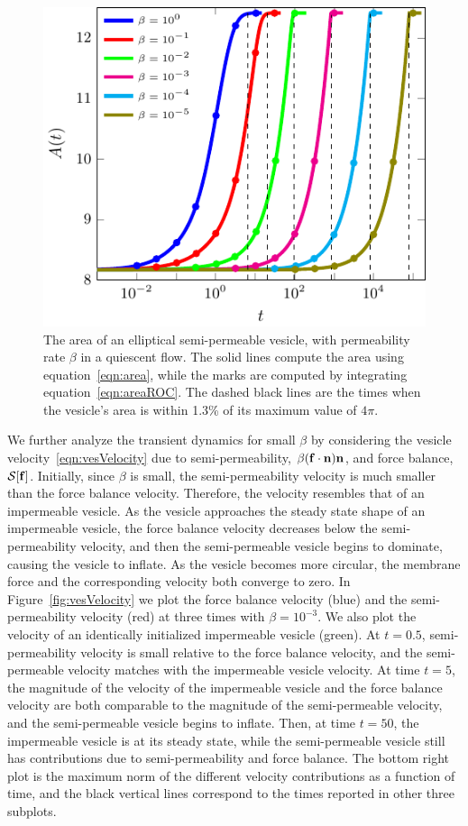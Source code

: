 \documentclass[9pt,twocolumn,twoside,lineno]{pnas-new}
\newif\ifTikz
\begin{document}
\begin{figure}[htp]
  \centering
%  
  \includegraphics[width=0.8\linewidth]{figures/ellipseArea}
  \caption{\label{fig:ellipseArea} The area of an elliptical
  semi-permeable vesicle, with permeability rate $\beta$ in a quiescent
  flow. The solid lines compute the area using
  equation~\eqref{eqn:area}, while the marks are computed by integrating
  equation~\eqref{eqn:areaROC}. The dashed black lines are the times
  when the vesicle's area is within 1.3\% of its maximum value of
  $4\pi$.}
\end{figure}

We further analyze the transient dynamics for small $\beta$ by
considering the vesicle velocity~\eqref{eqn:vesVelocity} due to
semi-permeability, $\beta(\mathbf{f} \cdot \mathbf{n})\mathbf{n}$, and force balance,
$\mathcal{S}[\mathbf{f}]$. Initially, since $\beta$ is small, the semi-permeability
velocity is much smaller than the force balance velocity. Therefore, the
velocity resembles that of an impermeable vesicle. As the
vesicle approaches the steady state shape of an impermeable vesicle, the
force balance velocity decreases below the semi-permeability velocity,
and then the semi-permeable vesicle begins to dominate, causing the
vesicle to inflate.  As the vesicle becomes more circular, the
membrane force and the corresponding velocity both converge to
zero. In Figure~\ref{fig:vesVelocity} we plot the force balance velocity
(blue) and the semi-permeability velocity (red) at three times with
$\beta=10^{-3}$. We also plot the velocity of an identically initialized
impermeable vesicle (green).  At $t=0.5$, semi-permeability velocity is
small relative to the force balance velocity, and the semi-permeable
velocity matches with the impermeable vesicle velocity. At time $t=5$,
the magnitude of the velocity of the impermeable vesicle and the force
balance velocity are both comparable to the magnitude of the
semi-permeable velocity, and the semi-permeable vesicle begins to
inflate. Then, at time $t=50$, the impermeable vesicle is at its steady
state, while the semi-permeable vesicle still has contributions due to
semi-permeability and force balance. The bottom right plot is the
maximum norm of the different velocity contributions as a function of
time, and the black vertical lines correspond to the times reported in
other three subplots.
\end{document}
